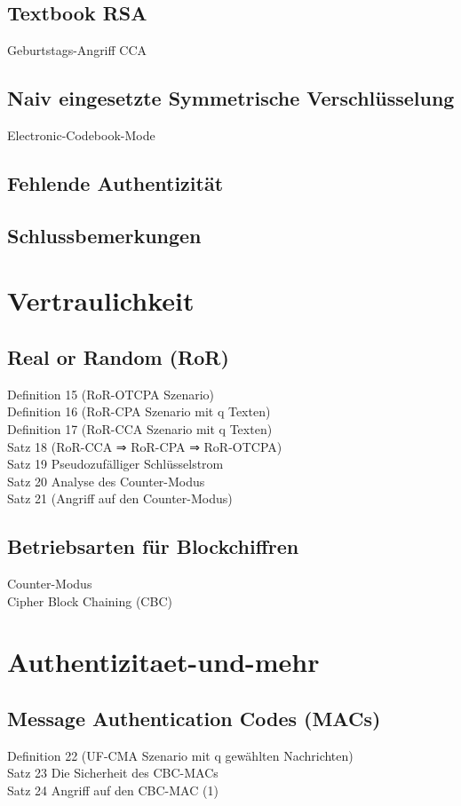 \documentclass[10pt,a4paper]{article}
\begin{document}
\subsection{Textbook RSA}
Geburtstags-Angriff
CCA
\subsection{Naiv eingesetzte Symmetrische Verschlüsselung}
Electronic-Codebook-Mode
\subsection{Fehlende Authentizität}
\subsection{Schlussbemerkungen}
\section{Vertraulichkeit}
\subsection{Real or Random (RoR)}
Definition 15 (RoR-OTCPA Szenario)\\
Definition 16 (RoR-CPA Szenario mit q Texten)\\
Definition 17 (RoR-CCA Szenario mit q Texten)\\
Satz 18 (RoR-CCA ⇒ RoR-CPA ⇒ RoR-OTCPA)\\
Satz 19 Pseudozufälliger Schlüsselstrom\\
Satz 20 Analyse des Counter-Modus\\
Satz 21 (Angriff auf den Counter-Modus)
\subsection{Betriebsarten für Blockchiffren}
Counter-Modus\\
Cipher Block Chaining (CBC)
\section{Authentizitaet-und-mehr}
\subsection{Message Authentication Codes (MACs)}
Definition 22 (UF-CMA Szenario mit q gewählten Nachrichten)\\
Satz 23 Die Sicherheit des CBC-MACs\\
Satz 24 Angriff auf den CBC-MAC (1) 
\end{document}
